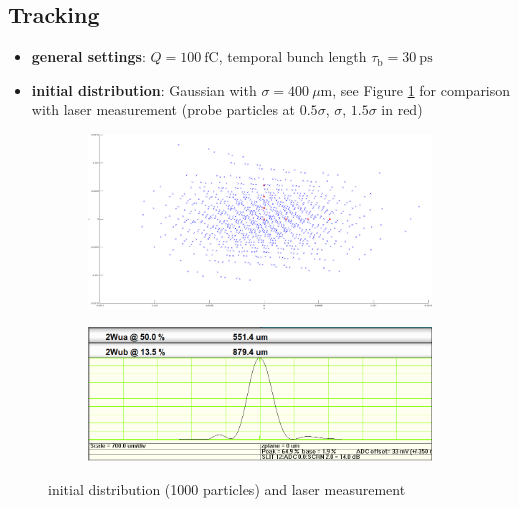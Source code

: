 \subsection{Tracking}
\begin{itemize}
   \item \textbf{general settings}: $Q=100\ \mathrm{fC}$, temporal bunch length $\tau_\mathrm{b}=30\ \mathrm{ps}$
   \item \textbf{initial distribution}: Gaussian with $\sigma=400\ \mu\mathrm{m}$, see Figure \ref{fig:generator} for comparison with laser measurement (probe particles at $0.5\sigma$, $\sigma$, $1.5\sigma$ in red)
\end{itemize}

\begin{center}
\begin{figure}[H]
   \begin{subfigure}{0.45\textwidth}
      \includegraphics[width=\textwidth]{fig/generator}
   \end{subfigure}
   \begin{subfigure}{0.45\textwidth}
      \includegraphics[width=\textwidth]{fig/laser}
   \end{subfigure}
   \caption{initial distribution (1000 particles) and laser measurement}
   \label{fig:generator}
\end{figure}
\end{center}

